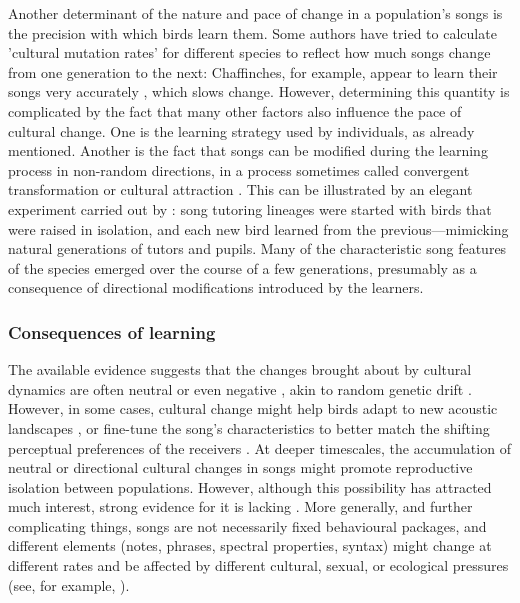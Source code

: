Another determinant of the nature and pace of change in a population’s songs is the precision with which birds learn them. Some authors have tried to calculate 'cultural mutation rates’ for different species to reflect how much songs change from one generation to the next: Chaffinches, for example, appear to learn their songs very accurately \autocite{lachlan2003a,Slater1986}, which slows change. However, determining this quantity is complicated by the fact that many other factors also influence the pace of cultural change. One is the learning strategy used by individuals, as already mentioned. Another is the fact that songs can be modified during the learning process in non-random directions, in a process sometimes called convergent transformation or cultural attraction \autocite{claidiere2018,gray2007,heyes1993,morin2016}. This can be illustrated by an elegant experiment carried out by \textcite{feher2009}: song tutoring lineages were started with birds that were raised in isolation, and each new bird learned from the previous---mimicking natural generations of tutors and pupils. Many of the characteristic song features of the species emerged over the course of a few generations, presumably as a consequence of directional modifications introduced by the learners.

\subsubsection{Consequences of learning}
The available evidence suggests that the changes brought about by cultural dynamics are often neutral or even negative \autocite{langin2017,slater2003}, akin to random genetic drift \autocite{Grant2010}. However, in some cases, cultural change might help birds adapt to new acoustic landscapes \autocite{rios-chelen2012,slater2003}, or fine-tune the song’s characteristics to better match the shifting perceptual preferences of the receivers \autocite{Renoult2019b}. At deeper timescales, the accumulation of neutral or directional cultural changes in songs might promote reproductive isolation between populations. However, although this possibility has attracted much interest, strong evidence for it is lacking \autocite{freeman2022,Lachlan2004,verzijden2012,Yeh2015}. More generally, and further complicating things, songs are not necessarily fixed behavioural packages, and different elements (notes, phrases, spectral properties, syntax) might change at different rates and be affected by different cultural, sexual, or ecological pressures (see, for example, \cite{williams2013}).

